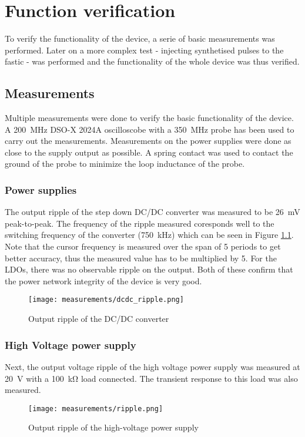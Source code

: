 \chapter{Function verification}
To verify the functionality of the device, a serie of basic measurements was performed. Later on a more complex test - injecting synthetised pulses to the fastic - was performed and the functionality of the whole device was thus verified.
\section{Measurements}
Multiple measurements were done to verify the basic functionality of the device. A \SI{200}{\mega\hertz} DSO-X 2024A oscilloscobe with a \SI{350}{\mega\hertz} probe has been used to carry out the measurements. Measurements on the power supplies were done as close to the supply output as possible. A spring contact was used to contact the ground of the probe to minimize the loop inductance of the probe.
\subsection{Power supplies}
The output ripple of the step down DC/DC converter was measured to be \SI{26}{\milli\volt} peak-to-peak. The frequency of the ripple measured coresponds well to the switching frequency of the converter (\SI{750}{\kilo\hertz}) which can be seen in Figure \ref{fig:dcdc_ripple}. Note that the cursor frequency is measured over the span of 5 periods to get better accuracy, thus the measured value has to be multiplied by 5. For the LDOs, there was no observable ripple on the output. Both of these confirm that the power network integrity of the device is very good.

\FloatBarrier
\begin{figure}[!htpb]
    \begin{center}
        \texttt{[image: measurements/dcdc\_ripple.png]}
        \caption{Output ripple of the DC/DC converter}
        \label{fig:dcdc_ripple}
    \end{center}
\end{figure}
\FloatBarrier

\subsection{High Voltage power supply}
Next, the output voltage ripple of the high voltage power supply was measured at \SI{20}{\volt} with a \SI{100}{\kilo\ohm} load connected. The transient response to this load was also measured. 
\FloatBarrier
\begin{figure}[!htpb]
    \begin{center}
        \texttt{[image: measurements/ripple.png]}
        \caption{Output ripple of the high-voltage power supply}
        \label{fig:hv_ripple}
    \end{center}
\end{figure}
\FloatBarrier

